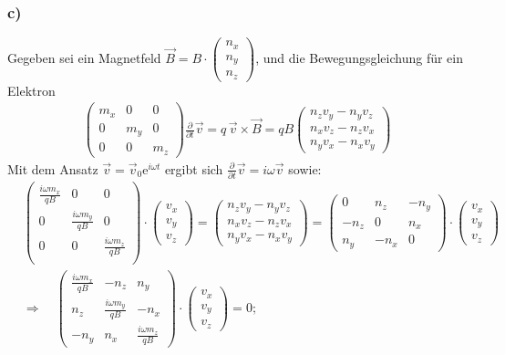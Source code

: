 \subsubsection*{c)}
Gegeben sei ein Magnetfeld $\vec B = B \cdot \begin{pmatrix} n_x \\n_y \\n_z \end{pmatrix}$,
und die Bewegungsgleichung für ein Elektron
\begin{align*}
\begin{pmatrix} m_x&0&0 \\0&m_y&0 \\0&0&m_z\end{pmatrix} \frac{\partial}{\partial t} \vec v=
 q \, \vec v \times \vec B = q B \begin{pmatrix}n_z v_y - n_y v_z \\ n_x v_z - n_z v_x \\ n_y v_x - n_x v_y\end{pmatrix}
\end{align*}
Mit dem Ansatz $\vec v = \vec v_0 \mathrm e^{i \omega t}$ ergibt sich
$\frac{\partial}{\partial t} \vec v = i \omega \vec v$ sowie:
\begin{align*}
& \begin{pmatrix}\frac{i \omega m_x}{q B}&0&0\\0&\frac{i \omega m_y}{q B}&0\\0&0&\frac{i \omega m_z}{q B}\\\end{pmatrix}
  \cdot \begin{pmatrix}v_x\\v_y\\v_z\end{pmatrix} =
  \begin{pmatrix}n_z v_y - n_y v_z \\ n_x v_z - n_z v_x \\ n_y v_x - n_x v_y\end{pmatrix} =
  \begin{pmatrix}0 & n_z &  - n_y \\ -n_z & 0 & n_x \\ n_y & -n_x & 0 \end{pmatrix}
  \cdot \begin{pmatrix}v_x\\v_y\\v_z\end{pmatrix} \\
&\Rightarrow \quad \begin{pmatrix}\frac{i \omega m_x}{q B}&-n_z& n_y \\
n_z&\frac{i \omega m_y}{q B}&-n_x \\ -n_y&n_x&\frac{i \omega m_z}{q B} \end{pmatrix}
  \cdot \begin{pmatrix}v_x\\v_y\\v_z\end{pmatrix} = 0;
\end{align*}
